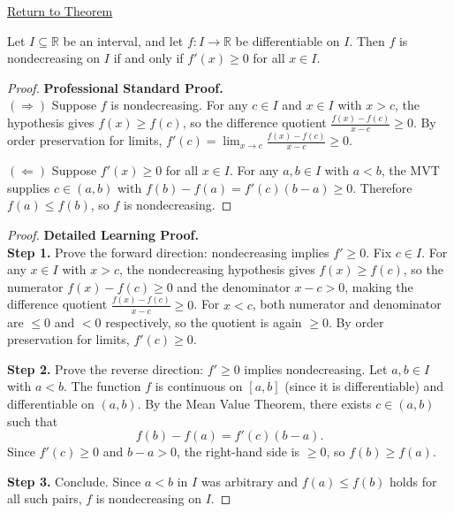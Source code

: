 \newpage
{}
\label{prf:nondecreasing-iff-nonneg-derivative}

\begin{remark*}[Return]
\hyperref[thm:nondecreasing-iff-nonneg-derivative]{Return to Theorem}
\end{remark*}

\begin{theorem*}
Let $I \subseteq \mathbb{R}$ be an interval, and let $f : I \to \mathbb{R}$ be differentiable on $I$. Then $f$ is nondecreasing on $I$ if and only if $f'(x) \geq 0$ for all $x \in I$.
\end{theorem*}

\begin{proof}
\textbf{Professional Standard Proof.}~\\
$(\Rightarrow)$ Suppose $f$ is nondecreasing. For any $c \in I$ and $x \in I$ with $x > c$, the hypothesis gives $f(x) \geq f(c)$, so the difference quotient $\tfrac{f(x)-f(c)}{x-c} \geq 0$. By order preservation for limits, $f'(c) = \lim_{x \to c} \tfrac{f(x)-f(c)}{x-c} \geq 0$.

$(\Leftarrow)$ Suppose $f'(x) \geq 0$ for all $x \in I$. For any $a, b \in I$ with $a < b$, the MVT supplies $c \in (a,b)$ with $f(b) - f(a) = f'(c)(b-a) \geq 0$. Therefore $f(a) \leq f(b)$, so $f$ is nondecreasing.
\end{proof}

\begin{proof}
\textbf{Detailed Learning Proof.}~\\

\textbf{Step 1.} Prove the forward direction: nondecreasing implies $f' \geq 0$. Fix $c \in I$. For any $x \in I$ with $x > c$, the nondecreasing hypothesis gives $f(x) \geq f(c)$, so the numerator $f(x) - f(c) \geq 0$ and the denominator $x - c > 0$, making the difference quotient $\tfrac{f(x)-f(c)}{x-c} \geq 0$. For $x < c$, both numerator and denominator are $\leq 0$ and $< 0$ respectively, so the quotient is again $\geq 0$. By order preservation for limits, $f'(c) \geq 0$.

\textbf{Step 2.} Prove the reverse direction: $f' \geq 0$ implies nondecreasing. Let $a, b \in I$ with $a < b$. The function $f$ is continuous on $[a,b]$ (since it is differentiable) and differentiable on $(a,b)$. By the Mean Value Theorem, there exists $c \in (a,b)$ such that
\[
f(b) - f(a) = f'(c)(b - a).
\]
Since $f'(c) \geq 0$ and $b - a > 0$, the right-hand side is $\geq 0$, so $f(b) \geq f(a)$.

\textbf{Step 3.} Conclude. Since $a < b$ in $I$ was arbitrary and $f(a) \leq f(b)$ holds for all such pairs, $f$ is nondecreasing on $I$.
\end{proof}

